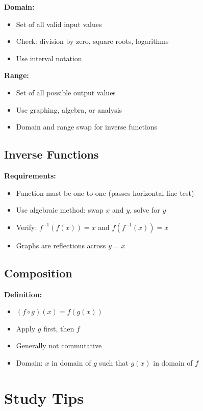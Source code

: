 \documentclass[12pt,a4paper]{article}
\begin{document}
\textbf{Domain:}
\begin{itemize}
    \item Set of all valid input values
    \item Check: division by zero, square roots, logarithms
    \item Use interval notation
\end{itemize}

\textbf{Range:}
\begin{itemize}
    \item Set of all possible output values
    \item Use graphing, algebra, or analysis
    \item Domain and range swap for inverse functions
\end{itemize}

\subsection{Inverse Functions}

\textbf{Requirements:}
\begin{itemize}
    \item Function must be one-to-one (passes horizontal line test)
    \item Use algebraic method: swap $x$ and $y$, solve for $y$
    \item Verify: $f^{-1}(f(x)) = x$ and $f(f^{-1}(x)) = x$
    \item Graphs are reflections across $y = x$
\end{itemize}

\subsection{Composition}

\textbf{Definition:}
\begin{itemize}
    \item $(f \circ g)(x) = f(g(x))$
    \item Apply $g$ first, then $f$
    \item Generally not commutative
    \item Domain: $x$ in domain of $g$ such that $g(x)$ in domain of $f$
\end{itemize}

\section{Study Tips}
\end{document}
